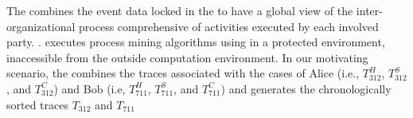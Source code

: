The  combines the event data locked in the  to have a global view of the inter-organizational process comprehensive of activities executed by each involved  party. .
 executes process mining algorithms using  in a protected environment, inaccessible from the outside computation environment.
In our motivating scenario, the  combines the traces associated with the cases of Alice (i.e., $T^H_{312}$, $T^S_{312}$, and $T^C_{312}$) and Bob (i.e, $T^H_{711}$, $T^S_{711}$, and $T^C_{711}$) and generates the chronologically sorted traces $T_{312}$ and $T_{711}$ 



